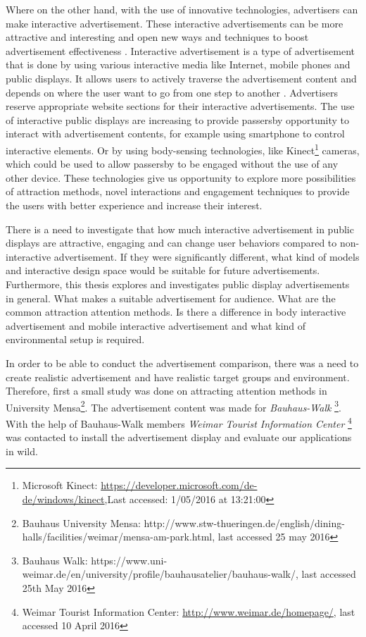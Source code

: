 Where on the other hand, with the use of innovative technologies, advertisers can make interactive advertisement. These interactive advertisements can be more attractive and interesting and open new ways and techniques to boost advertisement effectiveness \cite{add_effectivenss}. Interactive advertisement is a type of advertisement that is done by using various interactive media like Internet, mobile phones and public displays. It allows users to actively traverse the advertisement content and depends on where the user want to go from one step to another \cite{Non_inter_vs_interAd}. Advertisers reserve appropriate website sections for their interactive advertisements. The use of interactive public displays are increasing to provide passersby opportunity to interact with advertisement contents, for example using smartphone to control interactive elements. Or by using body-sensing technologies, like Kinect\footnote{Microsoft Kinect: \url{https://developer.microsoft.com/de-de/windows/kinect},Last accessed: 1/05/2016 at 13:21:00} cameras, which could be used to allow passersby to be engaged without the use of any other device. These technologies give us opportunity to explore more possibilities of attraction methods, novel interactions and engagement techniques to provide the users with better experience and increase their interest. 

There is a need to investigate that how much interactive advertisement in public displays are attractive, engaging and can change user behaviors compared to non-interactive advertisement. If they were significantly different, what kind of models and interactive design space would be suitable for future advertisements. Furthermore, this thesis explores and investigates public display advertisements in general. What makes a suitable advertisement for audience. What are the common attraction attention methods. Is there a difference in body interactive advertisement and mobile interactive advertisement and what kind of environmental setup is required.

In order to be able to conduct the advertisement comparison, there was a need to create realistic advertisement and have realistic target groups and environment. Therefore, first a small study was done on attracting attention methods in University Mensa\footnote{Bauhaus University Mensa: http://www.stw-thueringen.de/english/dining-halls/facilities/weimar/mensa-am-park.html, last accessed 25 may 2016}. The advertisement content was made for \emph{Bauhaus-Walk} \footnote{Bauhaus Walk: https://www.uni-weimar.de/en/university/profile/bauhausatelier/bauhaus-walk/, last accessed 25th May 2016}. With the help of Bauhaus-Walk members \emph{Weimar Tourist Information Center} \footnote{Weimar Tourist Information Center: \url{http://www.weimar.de/homepage/}, last accessed 10 April 2016} was contacted to install the advertisement display and evaluate our applications in wild.



